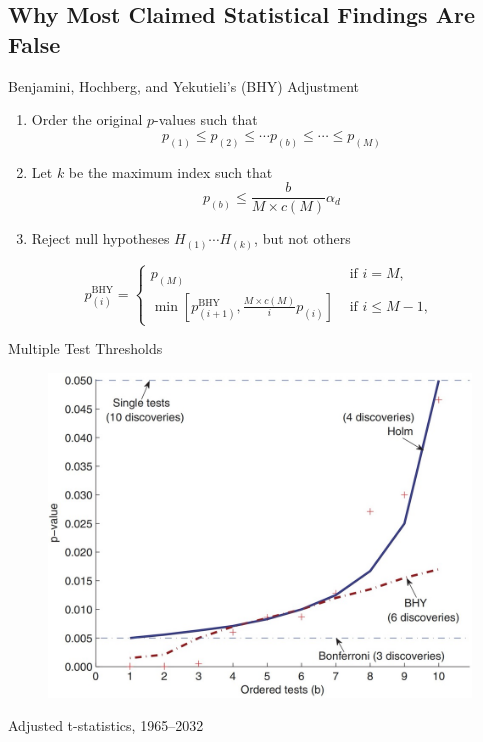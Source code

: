 \documentclass[UTF8, 16pt]{beamer}
\begin{document}
\begin{CJK*}{UTF8}{gbsn}
\section{Why Most Claimed Statistical Findings Are False}
\begin{frame}{Benjamini, Hochberg, and Yekutieli’s (BHY) Adjustment}
	\begin{enumerate}
		\item Order the original $p$-values such that $$p_{(1)} \leq p_{(2)} \leq \cdots p_{(b)} \leq \cdots \leq p_{(M)}$$
		\item Let $k$ be the maximum index such that $$p_{(b)} \leq \frac{b}{M \times c(M)} \alpha_{d}$$
		\item Reject null hypotheses $H_{(1)} \cdots H_{(k)}$, but not others
	\end{enumerate}
	$$
	p_{(i)}^{\text{BHY}}=\left\{\begin{array}{cl}p_{(M)} & \text { if } i=M, \\ \min \left[p_{(i+1)}^{\text{BHY}}, \frac{M \times c(M)}{i} p_{(i)}\right] & \text { if } i \leq M-1,\end{array}\right.
	$$
\end{frame}
\begin{frame}{Multiple Test Thresholds}
	\begin{figure}[htpb]
  	\begin{center}
    	\includegraphics[width=0.85 \linewidth]
    	{pic/Multiple_test_thresholds.jpg}
  	\end{center}
	\end{figure}
\end{frame}
\begin{frame}{Adjusted t-statistics, 1965–2032}
	\begin{figure}[htpb]

\end{figure}
\end{frame}
\end{CJK*}
\end{document}
